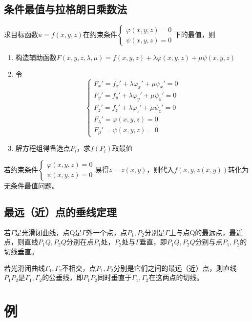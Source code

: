 \subsection{条件最值与拉格朗日乘数法}
求目标函数\(u = f(x, y, z)\)在约束条件\(\begin{cases}
    \varphi(x, y, z) = 0 \\ 
    \psi(x, y, z) = 0
\end{cases}\)下的最值，则\begin{enumerate}
    \item 构造辅助函数\(F(x, y, z, \lambda, \mu) = f(x, y, z) + \lambda\varphi(x, y, z) + \mu\psi(x, y, z)\)
    \item 令\[\begin{cases}
        F_x' = f_x' + \lambda\varphi_x' + \mu\psi_x' = 0 \\ 
        F_y' = f_y' + \lambda\varphi_y' + \mu\psi_y' = 0 \\ 
        F_z' = f_z' + \lambda\varphi_z' + \mu\psi_z' = 0 \\ 
        F_\lambda' = \varphi(x, y, z) = 0 \\ 
        F_\mu' = \psi(x, y, z) = 0
    \end{cases}\]
    \item 解方程组得备选点\(P_i\)，求\(f(P_i)\)取最值
\end{enumerate}
若约束条件\(\begin{cases}
    \varphi(x, y, z) = 0 \\ 
    \psi(x, y, z) = 0
\end{cases}\)易得\(z = z(x, y)\)，则代入\(f(x, y, z(x, y))\)转化为无条件最值问题。


\subsection{最远（近）点的垂线定理}
若\(\Gamma\)是光滑闭曲线，点Q是\(\Gamma\)外一个点，点\(P_1, P_2\)分别是\(\Gamma\)上与点Q的最远点，最近点，则直线\(P_1Q, P_2Q\)分别在点\(P_1\)处，\(P_2\)处与\(\Gamma\)垂直，即\(P_1Q, P_2Q\)分别与点\(P_1, P_2\)的切线垂直。

若光滑闭曲线\(\Gamma_1, \Gamma_2\)不相交，点\(P_1, P_2\)分别是它们之间的最远（近）点，则直线\(P_1P_2\)是\(\Gamma_1, \Gamma_2\)的公垂线，即\(P_1P_2\)同时垂直于\(\Gamma_1, \Gamma_2\)在这两点的切线。



\section{例}

